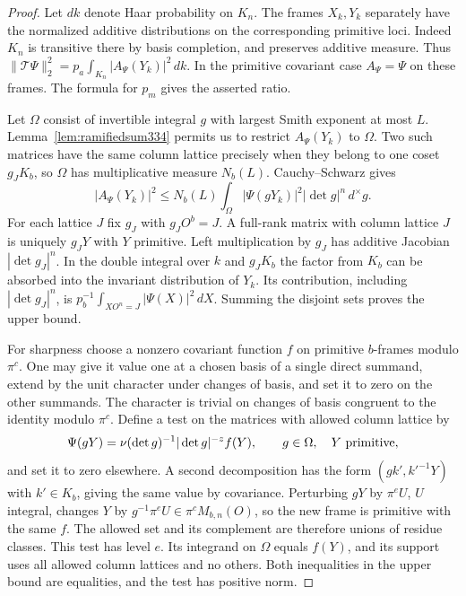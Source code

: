 \documentclass[a4paper,11pt]{article}
\theoremstyle{definition}
\theoremstyle{remark}
\numberwithin{equation}{section}
\begin{document}
\begin{proof}
Let \(dk\) denote Haar probability on \(K_n\). The frames \(X_k,Y_k\)
separately have the normalized additive distributions on the corresponding
primitive loci. Indeed \(K_n\) is transitive there by basis completion,
and preserves additive measure. Thus
\(\|\mathcal T\Psi\|_2^2=p_a\int_{K_n}|A_\Psi(Y_k)|^2\,dk\).
In the primitive covariant case \(A_\Psi=\Psi\) on these frames. The
formula for \(p_m\) gives the asserted ratio.

Let \(\Omega\) consist of invertible integral \(g\) with largest Smith
exponent at most \(L\). Lemma~\ref{lem:ramifiedsum334} permits us to
restrict \(A_\Psi(Y_k)\) to \(\Omega\). Two such matrices have the same
column lattice precisely when they belong to one coset \(g_JK_b\),
so \(\Omega\) has multiplicative measure \(N_b(L)\). Cauchy--Schwarz gives
\[
 |A_\Psi(Y_k)|^2\le N_b(L)
       \int_\Omega |\Psi(gY_k)|^2|\det g|^n\,d^\times g .
\]
For each lattice \(J\) fix \(g_J\) with \(g_J O^b=J\). A full-rank
matrix with column lattice \(J\) is uniquely \(g_JY\) with \(Y\)
primitive. Left multiplication by \(g_J\) has additive Jacobian
\(|\det g_J|^n\). In the double integral over \(k\) and \(g_JK_b\)
the factor from \(K_b\) can be absorbed into the invariant distribution
of \(Y_k\). Its contribution, including \(|\det g_J|^n\), is
\(p_b^{-1}\int_{XO^n=J}|\Psi(X)|^2\,dX\). Summing the disjoint
sets proves the upper bound.

For sharpness choose a nonzero covariant function \(f\) on primitive
\(b\)-frames modulo \(\pi^c\). One may give it value one at a chosen
basis of a single direct summand, extend by the unit character under
changes of basis, and set it to zero on the other summands. The
character is trivial on changes of basis congruent to the identity
modulo \(\pi^c\). Define a test on the matrices with allowed column lattice by
\[
     \Psi(gY)=\nu(\det g)^{-1}|\det g|^{-z}f(Y),
                \qquad g\in\Omega,\quad Y\ {\rm primitive},
\]
and set it to zero elsewhere. A second decomposition has the form
\((gk',k'^{-1}Y)\) with \(k'\in K_b\), giving the same value by
covariance. Perturbing \(gY\) by \(\pi^e U\), \(U\) integral, changes
\(Y\) by \(g^{-1}\pi^e U\in\pi^c M_{b,n}(O)\), so the new frame is
primitive with the same \(f\). The allowed set and its complement are
therefore unions of residue classes. This test has level \(e\). Its
integrand on \(\Omega\) equals \(f(Y)\), and its support uses all allowed
column lattices and no others. Both inequalities in the upper bound are
equalities, and the test has positive norm.
\end{proof}
\end{document}
